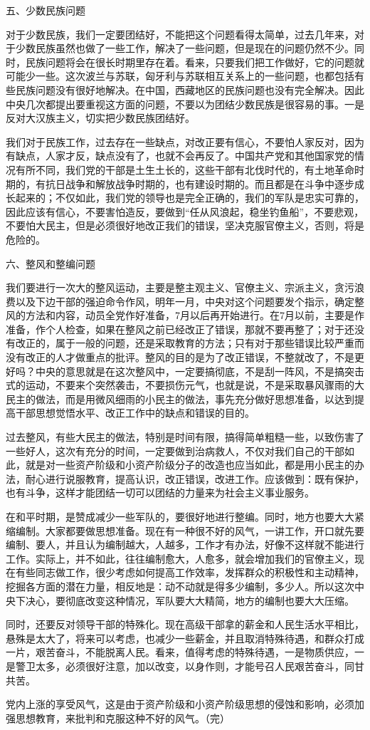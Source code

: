五、少数民族问题

对于少数民族，我们一定要团结好，不能把这个问题看得太简单，过去几年来，对于少数民族虽然也做了一些工作，解决了一些问题，但是现在的问题仍然不少。同时，民族问题将会在很长时期里存在着。看来，只要我们把工作做好，它的问题就可能少一些。这次波兰与苏联，匈牙利与苏联相互关系上的一些问题，也都包括有些民族问题没有很好地解决。在中国，西藏地区的民族问题也没有完全解决。因此中央几次都提出要重视这方面的问题，不要以为团结少数民族是很容易的事。一是反对大汉族主义，切实把少数民族团结好。

我们对于民族工作，过去存在一些缺点，对改正要有信心，不要怕人家反对，因为有缺点，人家才反，缺点没有了，也就不会再反了。中国共产党和其他国家党的情况有所不同，我们党的干部是土生土长的，这些干部有北伐时代的，有土地革命时期的，有抗日战争和解放战争时期的，也有建设时期的。而且都是在斗争中逐步成长起来的；不仅如此，我们党的领导也是完全正确的，我们的军队是忠实可靠的，因此应该有信心，不要害怕造反，要做到“任从风浪起，稳坐钓鱼船”，不要悲观，不要怕大民主，但是必须很好地改正我们的错误，坚决克服官僚主义，否则，将是危险的。

六、整风和整编问题

我们要进行一次大的整风运动，主要是整主观主义、官僚主义、宗派主义，贪污浪费以及下边干部的强迫命令作风，明年一月，中央对这个问题要发个指示，确定整风的方法和内容，动员全党作好准备，7月以后再开始进行。在7月以前，主要是作准备，作个人检查，如果在整风之前已经改正了错误，那就不要再整了；对于还没有改正的，属于一般的问题，还是采取教育的方法；只有对于那些错误比较严重而没有改正的人才做重点的批评。整风的目的是为了改正错误，不整就改了，不是更好吗？中央的意思就是在这次整风中，一定要搞彻底，不是刮一阵风，不是搞突击式的运动，不要来个突然袭击，不要损伤元气，也就是说，不是采取暴风骤雨的大民主的做法，而是用微风细雨的小民主的做法，事先充分做好思想准备，以达到提高干部思想觉悟水平、改正工作中的缺点和错误的目的。

过去整风，有些大民主的做法，特别是时间有限，搞得简单粗糙一些，以致伤害了一些好人，这次有充分的时间，一定要做到治病救人，不仅对我们自己的干部如此，就是对一些资产阶级和小资产阶级分子的改造也应当如此，都是用小民主的办法，耐心进行说服教育，提高认识，改正错误，改进工作。应该做到：既有保护，也有斗争，这样才能团结一切可以团结的力量来为社会主义事业服务。

在和平时期，是赞成减少一些军队的，要很好地进行整编。同时，地方也要大大紧缩编制。大家都要做思想准备。现在有一种很不好的风气，一讲工作，开口就先要编制、要人，并且认为编制越大，人越多，工作才有办法，好像不这样就不能进行工作。实际上，并不如此，往往编制愈大，人愈多，就会增加我们的官僚主义，现在有些同志做工作，很少考虑如何提高工作效率，发挥群众的积极性和主动精神，挖掘各方面的潜在力量，相反地是：动不动就是得多少编制，多少人。所以这次中央下决心，要彻底改变这种情况，军队要大大精简，地方的编制也要大大压缩。

同时，还要反对领导干部的特殊化。现在高级干部拿的薪金和人民生活水平相比，悬殊是太大了，将来可以考虑，也减少一些薪金，并且取消特殊待遇，和群众打成一片，艰苦奋斗，不能脱离人民。看来，值得考虑的特殊待遇，一是物质供应，一是警卫太多，必须很好注意，加以改变，以身作则，才能号召人民艰苦奋斗，同甘共苦。

党内上涨的享受风气，这是由于资产阶级和小资产阶级思想的侵蚀和影响，必须加强思想教育，来批判和克服这种不好的风气。（完）



